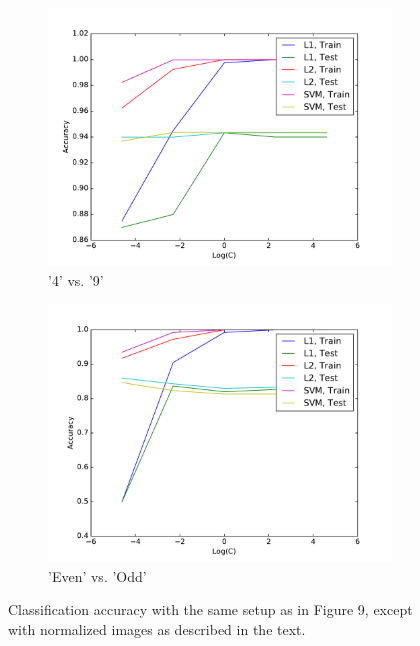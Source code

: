 \documentclass[10pt,psamsfonts]{amsart}
\theoremstyle{definition}
\theoremstyle{remark}
\numberwithin{equation}{section}
\begin{document}
\begin{figure}
\begin{subfigure}[b]{0.23\textwidth}
		\includegraphics[width=\textwidth]{hw2_4-1_4v9_norm.pdf}
		\caption{'4' vs. '9'}
	\end{subfigure}
	\begin{subfigure}[b]{0.23\textwidth}
		\includegraphics[width=\textwidth]{hw2_4-1_evo_norm.pdf}
		\caption{'Even' vs. 'Odd'}
	\end{subfigure}
	\caption{Classification accuracy with the same setup as in Figure 9, except with normalized images as described in the text.}
\end{figure}
\end{document}
